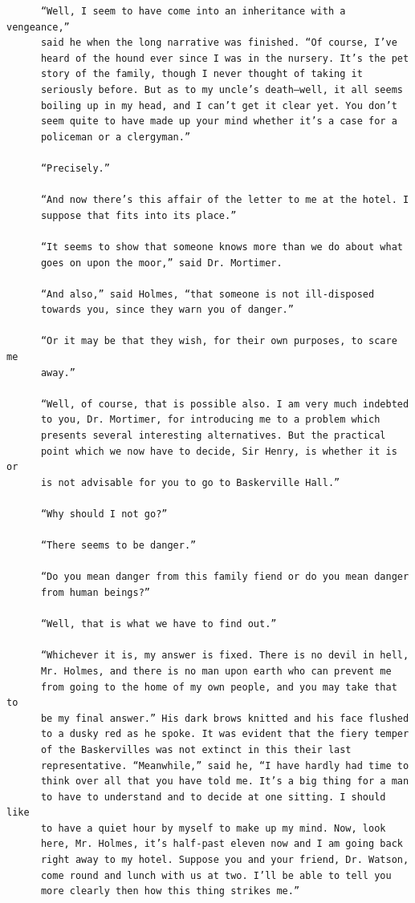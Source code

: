 \documentclass{article}
\begin{document}
\begin{verbatim}
      “Well, I seem to have come into an inheritance with a vengeance,”
      said he when the long narrative was finished. “Of course, I’ve
      heard of the hound ever since I was in the nursery. It’s the pet
      story of the family, though I never thought of taking it
      seriously before. But as to my uncle’s death—well, it all seems
      boiling up in my head, and I can’t get it clear yet. You don’t
      seem quite to have made up your mind whether it’s a case for a
      policeman or a clergyman.”

      “Precisely.”

      “And now there’s this affair of the letter to me at the hotel. I
      suppose that fits into its place.”

      “It seems to show that someone knows more than we do about what
      goes on upon the moor,” said Dr. Mortimer.

      “And also,” said Holmes, “that someone is not ill-disposed
      towards you, since they warn you of danger.”

      “Or it may be that they wish, for their own purposes, to scare me
      away.”

      “Well, of course, that is possible also. I am very much indebted
      to you, Dr. Mortimer, for introducing me to a problem which
      presents several interesting alternatives. But the practical
      point which we now have to decide, Sir Henry, is whether it is or
      is not advisable for you to go to Baskerville Hall.”

      “Why should I not go?”

      “There seems to be danger.”

      “Do you mean danger from this family fiend or do you mean danger
      from human beings?”

      “Well, that is what we have to find out.”

      “Whichever it is, my answer is fixed. There is no devil in hell,
      Mr. Holmes, and there is no man upon earth who can prevent me
      from going to the home of my own people, and you may take that to
      be my final answer.” His dark brows knitted and his face flushed
      to a dusky red as he spoke. It was evident that the fiery temper
      of the Baskervilles was not extinct in this their last
      representative. “Meanwhile,” said he, “I have hardly had time to
      think over all that you have told me. It’s a big thing for a man
      to have to understand and to decide at one sitting. I should like
      to have a quiet hour by myself to make up my mind. Now, look
      here, Mr. Holmes, it’s half-past eleven now and I am going back
      right away to my hotel. Suppose you and your friend, Dr. Watson,
      come round and lunch with us at two. I’ll be able to tell you
      more clearly then how this thing strikes me.”


\end{verbatim}
\end{document}
